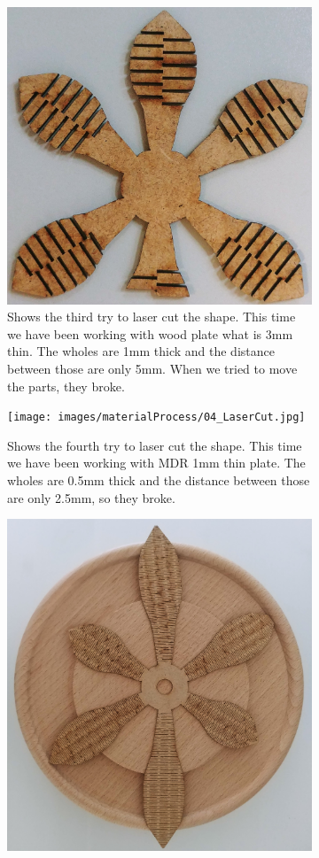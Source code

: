 \documentclass[04.3_buildingProcess.tex]{subfiles}
\begin{document}
\begin{flushleft}
\begin{figure}[H]
\begin{subfigure}{.45\textwidth}
                \includegraphics[width=0.6\linewidth]{images/materialProcess/03_LaserCut.jpg}
                \caption{Shows the third try to laser cut the shape. This time we have been
                        working with wood plate what is 3mm thin. The wholes are 1mm thick 
                        and the distance between those are only 5mm. When we tried to move
                        the parts, they broke.}
                \label{fig:03_LaserCut}
                \vspace{6mm}
            \end{subfigure}
            \hspace{1mm}
            \begin{subfigure}{.45\textwidth}
                \centering
                \texttt{[image: images/materialProcess/04\_LaserCut.jpg]}
                \caption{Shows the fourth try to laser cut the shape. This time we have been
                        working with MDR 1mm thin plate. The wholes are 0.5mm thick and the 
                        distance between those are only 2.5mm, so they broke.}
                \label{fig:04_LaserCut}
                \vspace{6mm}
            \end{subfigure}
            \hspace{1mm}
            \begin{subfigure}{.45\textwidth}
                \centering
                \includegraphics[width=0.6\linewidth]{images/materialProcess/06_LaserCut.jpg}

\end{subfigure}
\end{figure}
\end{flushleft}
\end{document}
